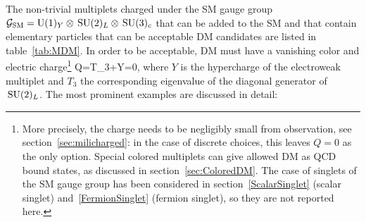 The non-trivial multiplets charged under the 
SM gauge group $\mathcal{G}_{\rm SM} = {\rm U}(1)_Y\otimes\,{\rm SU}(2)_L\otimes\,{\rm SU}(3)_c$ 
that can be added to the SM and that contain elementary particles that can be
acceptable DM candidates are listed in table~\ref{tab:MDM}.
In order to be acceptable, DM must have a vanishing color and electric charge\footnote{More precisely, the charge needs to be negligibly small from observation, see section~\ref{sec:milicharged}: 
in the case of discrete choices, this leaves $Q=0$ as the only option.
Special colored multiplets can give allowed DM as QCD bound states, as discussed in section~\ref{sec:ColoredDM}.
The case of singlets of the SM gauge group has been considered in 
section~\ref{ScalarSinglet} (scalar singlet) and~\ref{FermionSinglet} (fermion singlet), so they are not reported here.} 
\beq
Q=T_3+Y=0,
\eeq 
where $Y$ is the hypercharge of the electroweak multiplet and $T_3$ the corresponding eigenvalue of the diagonal generator of $\,{\rm SU}(2)_L$.
The most prominent examples are discussed in detail:
